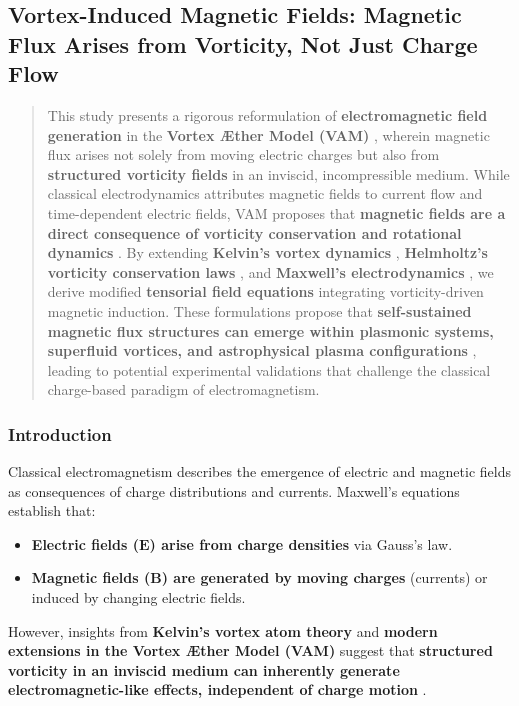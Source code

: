 

\subsection{Vortex-Induced Magnetic Fields: Magnetic Flux Arises from Vorticity, Not Just Charge Flow}\label{subsec:vortex-induced-magnetic-fields:-magnetic-flux-arises-from-vorticity-not-just-charge-flow}

\begin{abstract}
    This study presents a rigorous reformulation of \textbf{electromagnetic field generation}  in the \textbf{Vortex Æther Model (VAM)} , wherein magnetic flux arises not solely from moving electric charges but also from \textbf{structured vorticity fields}  in an inviscid, incompressible medium. While classical electrodynamics attributes magnetic fields to current flow and time-dependent electric fields, VAM proposes that \textbf{magnetic fields are a direct consequence of vorticity conservation and rotational dynamics} . By extending \textbf{Kelvin’s vortex dynamics} , \textbf{Helmholtz’s vorticity conservation laws} , and \textbf{Maxwell’s electrodynamics} , we derive modified \textbf{tensorial field equations}  integrating vorticity-driven magnetic induction. These formulations propose that \textbf{self-sustained magnetic flux structures can emerge within plasmonic systems, superfluid vortices, and astrophysical plasma configurations} , leading to potential experimental validations that challenge the classical charge-based paradigm of electromagnetism.
\end{abstract}

\subsubsection*{Introduction}
Classical electromagnetism describes the emergence of electric and magnetic fields as consequences of charge distributions and currents. Maxwell’s equations establish that:
\begin{itemize}
    \item \textbf{Electric fields (\(\mathbf{E}\)) arise from charge densities}  via Gauss’s law.
    \item \textbf{Magnetic fields (\(\mathbf{B}\)) are generated by moving charges}  (currents) or induced by changing electric fields.
\end{itemize}
However, insights from \textbf{Kelvin’s vortex atom theory}  and \textbf{modern extensions in the Vortex Æther Model (VAM)}  suggest that \textbf{structured vorticity in an inviscid medium can inherently generate electromagnetic-like effects, independent of charge motion} .


